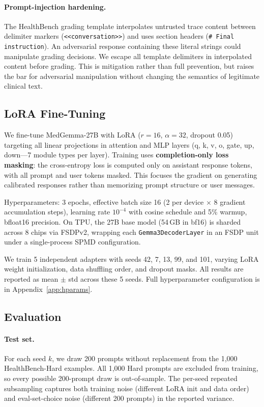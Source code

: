 \documentclass{article}
\newcommand{\hbhard}{HealthBench-Hard}
\begin{document}
\paragraph{Prompt-injection hardening.} The HealthBench grading template interpolates untrusted trace content between delimiter markers (\texttt{<<conversation>>}) and uses section headers (\texttt{\# Final instruction}). An adversarial response containing these literal strings could manipulate grading decisions. We escape all template delimiters in interpolated content before grading. This is mitigation rather than full prevention, but raises the bar for adversarial manipulation without changing the semantics of legitimate clinical text.

\subsection{LoRA Fine-Tuning}

We fine-tune MedGemma-27B with LoRA ($r{=}16$, $\alpha{=}32$, dropout 0.05) targeting all linear projections in attention and MLP layers (q, k, v, o, gate, up, down---7 module types per layer). Training uses \textbf{completion-only loss masking}: the cross-entropy loss is computed only on assistant response tokens, with all prompt and user tokens masked. This focuses the gradient on generating calibrated responses rather than memorizing prompt structure or user messages.

Hyperparameters: 3 epochs, effective batch size 16 (2 per device $\times$ 8 gradient accumulation steps), learning rate $10^{-4}$ with cosine schedule and 5\% warmup, bfloat16 precision. On TPU, the 27B base model (54\,GB in bf16) is sharded across 8 chips via FSDPv2, wrapping each \texttt{Gemma3DecoderLayer} in an FSDP unit under a single-process SPMD configuration.

We train 5 independent adapters with seeds 42, 7, 13, 99, and 101, varying LoRA weight initialization, data shuffling order, and dropout masks. All results are reported as mean $\pm$ std across these 5 seeds. Full hyperparameter configuration is in Appendix~\ref{app:hparams}.

\subsection{Evaluation}
\label{sec:eval}

\paragraph{Test set.} For each seed $k$, we draw 200 prompts without replacement from the 1,000 \hbhard{} examples. All 1,000 Hard prompts are excluded from training, so every possible 200-prompt draw is out-of-sample. The per-seed repeated subsampling captures both training noise (different LoRA init and data order) and eval-set-choice noise (different 200 prompts) in the reported variance.
\end{document}

